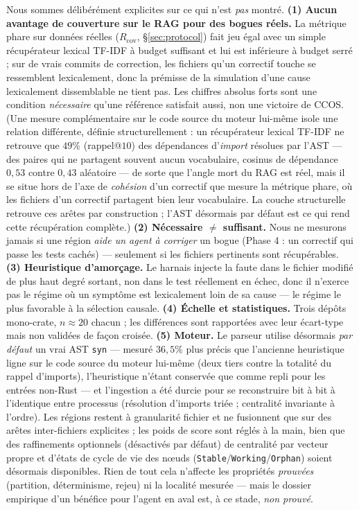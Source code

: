 \documentclass[11pt]{article}
\begin{document}
Nous sommes délibérément explicites sur ce qui n'est \emph{pas} montré.
\textbf{(1) Aucun avantage de couverture sur le RAG pour des bogues réels.} La métrique
phare sur données réelles ($R_{\mathrm{cov}}$, \S\ref{sec:protocol}) fait jeu égal avec un
simple récupérateur lexical TF-IDF à budget suffisant et lui est inférieure à budget serré ;
sur de vrais commits de correction, les fichiers qu'un correctif touche se ressemblent
lexicalement, donc la prémisse de la simulation d'une cause lexicalement dissemblable ne
tient pas. Les chiffres absolus forts sont une condition \emph{nécessaire} qu'une référence
satisfait aussi, non une victoire de CCOS.
(Une mesure complémentaire sur le code source du moteur lui-même isole une relation
différente, définie structurellement : un récupérateur lexical TF-IDF ne retrouve que
$49\%$ (rappel@$10$) des dépendances d'\emph{import} résolues par l'AST --- des paires
qui ne partagent souvent aucun vocabulaire, cosinus de dépendance $0{,}53$ contre $0{,}43$
aléatoire --- de sorte que l'angle mort du RAG est réel, mais il se situe hors de l'axe de
\emph{cohésion} d'un correctif que mesure la métrique phare, où les fichiers d'un correctif
partagent bien leur vocabulaire. La couche structurelle retrouve ces arêtes par construction ;
l'AST désormais par défaut est ce qui rend cette récupération complète.)
\textbf{(2) Nécessaire $\neq$ suffisant.} Nous ne mesurons jamais si une région \emph{aide
un agent à corriger} un bogue (Phase 4 : un correctif qui passe les tests cachés) --- seulement
si les fichiers pertinents sont récupérables.
\textbf{(3) Heuristique d'amorçage.} Le harnais injecte la faute dans le fichier modifié de
plus haut degré sortant, non dans le test réellement en échec, donc il n'exerce pas le régime
où un symptôme est lexicalement loin de sa cause --- le régime le plus favorable à la
sélection causale.
\textbf{(4) Échelle et statistiques.} Trois dépôts mono-crate, $n\!\approx\!20$ chacun ; les
différences sont rapportées avec leur écart-type mais non validées de façon croisée.
\textbf{(5) Moteur.} Le parseur utilise désormais \emph{par défaut} un vrai AST \texttt{syn}
--- mesuré $36{,}5\%$ plus précis que l'ancienne heuristique ligne sur le code source du moteur
lui-même (deux tiers contre la totalité du rappel d'imports), l'heuristique n'étant conservée
que comme repli pour les entrées non-Rust --- et l'ingestion a été durcie pour se reconstruire
bit à bit à l'identique entre processus (résolution d'imports triée ; centralité invariante à
l'ordre). Les régions restent à granularité fichier et ne fusionnent que sur des arêtes
inter-fichiers explicites ; les poids de score sont réglés à la main, bien que des raffinements
optionnels (désactivés par défaut) de centralité par vecteur propre et d'états de cycle de vie
des nœuds (\texttt{Stable}/\texttt{Working}/\texttt{Orphan}) soient désormais disponibles. Rien
de tout cela n'affecte les propriétés \emph{prouvées} (partition, déterminisme, rejeu) ni la
localité mesurée --- mais le dossier empirique d'un bénéfice pour l'agent en aval est, à ce
stade, \emph{non prouvé}.
\end{document}
